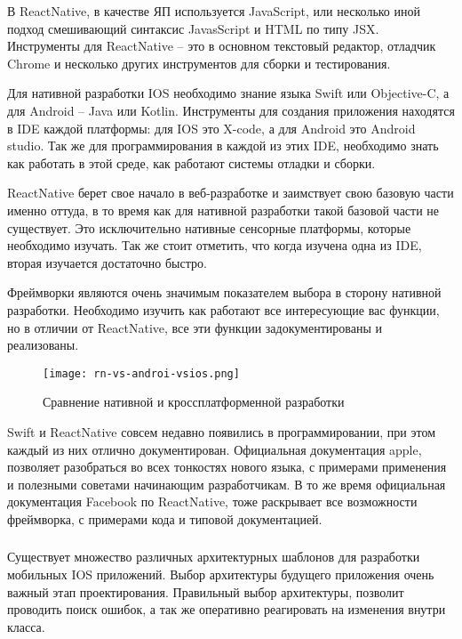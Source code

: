 В ReactNative, в качестве ЯП используется
JavaScript, или несколько иной подход смешивающий синтаксис JavasScript и
HTML по типу JSX. Инструменты для ReactNative – это в основном текстовый
редактор, отладчик Chrome и несколько других инструментов для сборки и
тестирования. 

Для нативной разработки IOS необходимо знание языка Swift или
Objective-C, а для Android – Java или Kotlin. Инструменты для создания
приложения находятся в IDE каждой платформы: для IOS это X-code, а для
Android это Android studio. Так же для программирования в каждой из этих IDE,
необходимо знать как работать в этой среде, как работают системы отладки и
сборки.

ReactNative берет свое начало в веб-разработке и заимствует свою
базовую части именно оттуда, в то время как для нативной разработки такой
базовой части не существует. Это исключительно нативные сенсорные
платформы, которые необходимо изучать. Так же стоит отметить, что когда
изучена одна из IDE, вторая изучается достаточно быстро.

Фреймворки являются очень значимым показателем выбора в сторону
нативной разработки. Необходимо изучить как работают все интересующие вас
функции, но в отличии от ReactNative, все эти функции задокументированы и
реализованы. 

\begin{figure}[H]
	\centering
	\texttt{[image: rn-vs-androi-vsios.png]} 
	\caption{Сравнение нативной и кроссплатформенной разработки}
	\label{fig:analysis:analogues:bsuir}
\end{figure}

Swift и ReactNative совсем недавно появились в программировании, при
этом каждый из них отлично документирован. Официальная документация
apple, позволяет разобраться во всех тонкостях нового языка, с примерами
применения и полезными советами начинающим разработчикам. В то же время 
официальная документация Facebook по ReactNative, тоже раскрывает все
возможности фреймворка, с примерами кода и типовой документацией. 

\subsubsection{}
\label{sec:analysis:literature:architecture}

Существует множество различных архитектурных шаблонов для
разработки мобильных IOS приложений. Выбор архитектуры будущего
приложения очень важный этап проектирования. Правильный выбор
архитектуры, позволит проводить поиск ошибок, а так же оперативно
реагировать на изменения внутри класса. 

